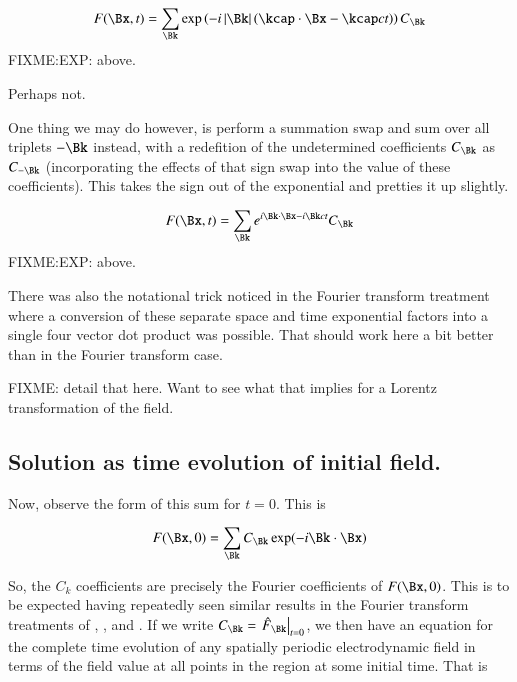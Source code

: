 \documentclass{article}
\begin{document}
\begin{align*}
F(\Bx,t) = \sum_{\Bk} \exp\left(-i \Abs{\Bk}(\kcap \cdot \Bx - \kcap c t) \right) C_{\Bk} 
\end{align*}
FIXME:EXP: above.

Perhaps not.

One thing we may do however, is perform a summation swap and sum over all
triplets $-\Bk$ instead, with a redefition of the undetermined
coefficients $C_{\Bk}$ as $C_{-\Bk}$ (incorporating the effects of that sign swap into the value of these coefficients).  This takes the sign out of the exponential and pretties it up slightly.

\begin{align*}
F(\Bx,t) = \sum_{\Bk} e^{i \Bk \cdot \Bx - i\Bk c t} C_{\Bk} 
\end{align*}
FIXME:EXP: above.

There was also the notational trick noticed in the Fourier transform treatment 
where a conversion of these separate space and time exponential factors into a single
four vector dot product was possible.  That should work here a bit better than in the Fourier transform case.

FIXME: detail that here.  Want to see what that implies for a Lorentz transformation of the field.

\subsection{ Solution as time evolution of initial field. }

Now, observe the form of this sum for $t=0$.  This is

\begin{align*}
F(\Bx,0) 
&= \sum_{\Bk} C_{\Bk} \exp(-i \Bk \cdot \Bx ) \\
\end{align*}

So, the $C_k$ coefficients are precisely the Fourier coefficients of $F(\Bx,0)$.  This is to be expected having repeatedly seen similar results in the Fourier transform treatments of 
\cite{PJfourierMaxwellSecondOrder}, \cite{PJfirstOrderMaxwell}, and \cite{PJ4dFourier}.
If we write 
$
C_{\Bk}
=
{\left.\hat{F}_{\Bk}\right\vert}_{t=0}
$, we then have an equation for the complete time evolution of any spatially periodic electrodynamic field in terms of the field value at all points in the region at some initial time.  That is
\end{document}
